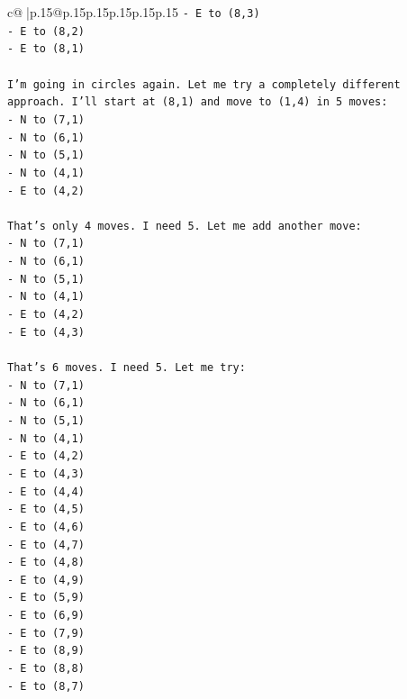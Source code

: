 \documentclass{article}
\begin{document}
{\begin{supertabular}{c@{$\;$}|p{.15\linewidth}@{}p{.15\linewidth}p{.15\linewidth}p{.15\linewidth}p{.15\linewidth}p{.15\linewidth}}
{{{\texttt{{-} E to (8,3)} \\
\texttt{{-} E to (8,2)} \\
\texttt{{-} E to (8,1)} \\
\\ 
\texttt{I'm going in circles again. Let me try a completely different approach. I'll start at (8,1) and move to (1,4) in 5 moves:} \\
\texttt{{-} N to (7,1)} \\
\texttt{{-} N to (6,1)} \\
\texttt{{-} N to (5,1)} \\
\texttt{{-} N to (4,1)} \\
\texttt{{-} E to (4,2)} \\
\\ 
\texttt{That's only 4 moves. I need 5. Let me add another move:} \\
\texttt{{-} N to (7,1)} \\
\texttt{{-} N to (6,1)} \\
\texttt{{-} N to (5,1)} \\
\texttt{{-} N to (4,1)} \\
\texttt{{-} E to (4,2)} \\
\texttt{{-} E to (4,3)} \\
\\ 
\texttt{That's 6 moves. I need 5. Let me try:} \\
\texttt{{-} N to (7,1)} \\
\texttt{{-} N to (6,1)} \\
\texttt{{-} N to (5,1)} \\
\texttt{{-} N to (4,1)} \\
\texttt{{-} E to (4,2)} \\
\texttt{{-} E to (4,3)} \\
\texttt{{-} E to (4,4)} \\
\texttt{{-} E to (4,5)} \\
\texttt{{-} E to (4,6)} \\
\texttt{{-} E to (4,7)} \\
\texttt{{-} E to (4,8)} \\
\texttt{{-} E to (4,9)} \\
\texttt{{-} E to (5,9)} \\
\texttt{{-} E to (6,9)} \\
\texttt{{-} E to (7,9)} \\
\texttt{{-} E to (8,9)} \\
\texttt{{-} E to (8,8)} \\
\texttt{{-} E to (8,7)} \\
}}}
\end{supertabular}}
\end{document}
